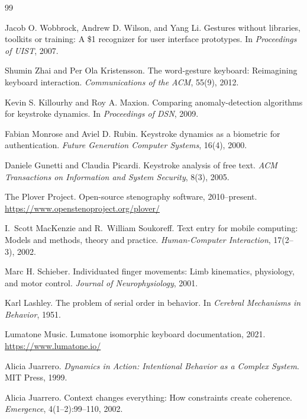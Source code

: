 \documentclass[11pt, a4paper]{article}
\begin{document}
\begin{thebibliography}{99}

Jacob O. Wobbrock, Andrew D. Wilson, and Yang Li.
\newblock Gestures without libraries, toolkits or training: A \$1 recognizer
  for user interface prototypes.
\newblock In \emph{Proceedings of UIST}, 2007.

Shumin Zhai and Per Ola Kristensson.
\newblock The word-gesture keyboard: Reimagining keyboard interaction.
\newblock \emph{Communications of the ACM}, 55(9), 2012.

Kevin S. Killourhy and Roy A. Maxion.
\newblock Comparing anomaly-detection algorithms for keystroke dynamics.
\newblock In \emph{Proceedings of DSN}, 2009.

Fabian Monrose and Aviel D. Rubin.
\newblock Keystroke dynamics as a biometric for authentication.
\newblock \emph{Future Generation Computer Systems}, 16(4), 2000.

Daniele Gunetti and Claudia Picardi.
\newblock Keystroke analysis of free text.
\newblock \emph{ACM Transactions on Information and System Security}, 8(3),
  2005.

The Plover Project.
\newblock Open-source stenography software, 2010--present.
\newblock \url{https://www.openstenoproject.org/plover/}

I.~Scott MacKenzie and R.~William Soukoreff.
\newblock Text entry for mobile computing: Models and methods, theory and
  practice.
\newblock \emph{Human-Computer Interaction}, 17(2--3), 2002.

Marc H. Schieber.
\newblock Individuated finger movements: Limb kinematics, physiology, and motor
  control.
\newblock \emph{Journal of Neurophysiology}, 2001.

Karl Lashley.
\newblock The problem of serial order in behavior.
\newblock In \emph{Cerebral Mechanisms in Behavior}, 1951.

Lumatone Music.
\newblock Lumatone isomorphic keyboard documentation, 2021.
\newblock \url{https://www.lumatone.io/}

Alicia Juarrero.
\newblock \emph{Dynamics in Action: Intentional Behavior as a Complex System}.
\newblock MIT Press, 1999.

Alicia Juarrero.
\newblock Context changes everything: How constraints create coherence.
\newblock \emph{Emergence}, 4(1--2):99--110, 2002.


\end{thebibliography}
\end{document}
